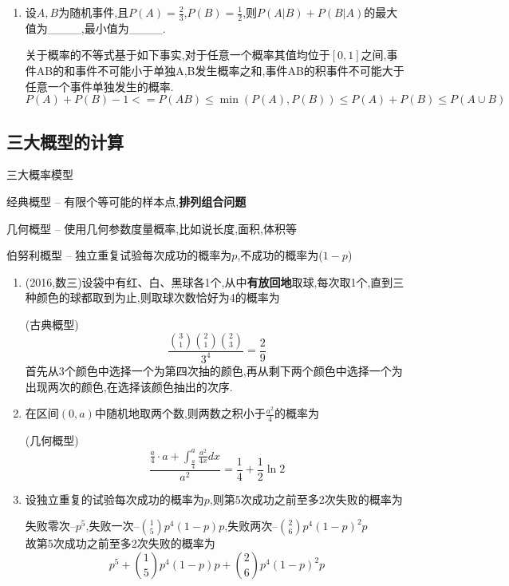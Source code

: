 \documentclass[12pt, a4paper, oneside, UTF8]{ctexbook}
\begin{document}
\begin{enumerate}[label=\arabic*.]
    \item 设$A,B$为随机事件,且$P(A)=\frac{2}{3}$,$P(B)=\frac{1}{2}$,则$P(A|B)+P(B|A)$的最大值为\_\_\_\_,最小值为\_\_\_\_.
    
    \begin{solution}
    关于概率的不等式基于如下事实,对于任意一个概率其值均位于$[0,1]$之间,事件AB的和事件不可能小于单独A,B发生概率之和,事件AB的积事件不可能大于
    任意一个事件单独发生的概率.
    \[
    P(A)+P(B) - 1<=P(AB) \leq \min{(P(A),P(B))}  \leq P(A) + P(B) \leq P(A\cup B) 
    \]
    \end{solution}
\end{enumerate}

\subsection{三大概型的计算}
\begin{remark}
    三大概率模型
    \item 经典概型 -- 有限个等可能的样本点,\textbf{排列组合问题}
    \item 几何概型 -- 使用几何参数度量概率,比如说长度,面积,体积等
    \item 伯努利概型 -- 独立重复试验每次成功的概率为$p$,不成功的概率为($1-p$)
\end{remark}
\begin{enumerate}[label=\arabic*.,start=6]
    \item (2016,数三)设袋中有红、白、黑球各1个,从中\textbf{有放回地}取球,每次取1个,直到三种颜色的球都取到为止,则取球次数恰好为4的概率为
    
    \begin{solution}
    (古典概型) 
    \[\frac{\binom{3}{1}\binom{2}{1}\binom{2}{3}}{3^4}=\frac{2}{9}\]
    首先从3个颜色中选择一个为第四次抽的颜色,再从剩下两个颜色中选择一个为出现两次的颜色,在选择该颜色抽出的次序.
    \end{solution}
    \item 在区间$(0,a)$中随机地取两个数,则两数之积小于$\frac{a^2}{4}$的概率为
    
    \begin{solution}
    (几何概型)
    \[
    \frac{\frac{a}{4}\cdot a + \int_{\frac{a}{4}}^{a}\frac{a^2}{4x}dx}{a^2} = \frac{1}{4} + \frac{1}{2}\ln{2}
    \]
    \end{solution}
    \item 设独立重复的试验每次成功的概率为$p$,则第5次成功之前至多2次失败的概率为
    
    \begin{solution}
    失败零次--$p^5$,失败一次--$\binom{1}{5}p^4(1-p)p$,失败两次--$\binom{2}{6}p^4(1-p)^2p$ \\
    故第5次成功之前至多2次失败的概率为
    \[
    p^5 + \binom{1}{5}p^4(1-p)p + \binom{2}{6}p^4(1-p)^2p
    \]
    \end{solution}
\end{enumerate}
\end{document}
